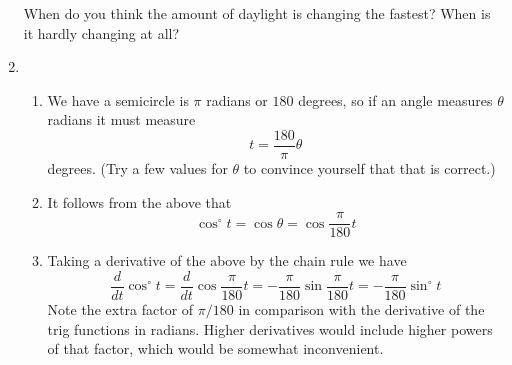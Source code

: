 \documentclass{article}
\begin{document}
\begin{enumerate}
  When do you think the amount of daylight is changing the fastest?
  When is it hardly changing at all?
\item %
  \begin{enumerate}
  \item We have a semicircle is $\pi$ radians or $180$ degrees, so if
    an angle measures $\theta$ radians it must measure
    \begin{equation*}
      t = \frac{180}{\pi} \theta
    \end{equation*}
    degrees.  (Try a few values for $\theta$ to convince yourself that
    that is correct.)
  \item It follows from the above that 
    \begin{equation*}
      \cos^{\circ} t = \cos\theta = \cos \frac{\pi}{180} t
    \end{equation*}
  \item Taking a derivative of the above by the chain rule we have
    \begin{equation*}
      \frac{d}{dt} \cos^{\circ} t 
      = \frac{d}{dt} \cos \frac{\pi}{180} t
      = -\frac{\pi}{180} \sin \frac{\pi}{180}t = -\frac{\pi}{180}
      \sin^{\circ} t
    \end{equation*}
    Note the extra factor of $\pi/180$ in comparison with the
    derivative of the trig functions in radians.  Higher derivatives
    would include higher powers of that factor, which would be
    somewhat inconvenient.
  \end{enumerate}
\end{enumerate}
\end{document}
